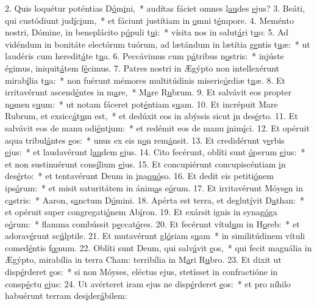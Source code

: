 2. Quis loquétur poténtias D\uline{ó}m\uline{i}ni,~* audítas fáciet omnes l\uline{au}des \uline{e}jus?
3. Beáti, qui custódiunt jud\uline{í}c\uline{i}um,~* et fáciunt justítiam in \uline{o}mni t\uline{é}mpore.
4. Meménto nostri, Dómine, in beneplácito p\uline{ó}puli t\uline{u}i:~* vísita nos in salut\uline{á}ri t\uline{u}o:
5. Ad vidéndum in bonitáte electórum tuórum, ad lætándum in lætítia g\uline{e}ntis t\uline{u}æ:~* ut laudéris cum heredit\uline{á}te t\uline{u}a.
6. Peccávimus cum p\uline{á}tribus n\uline{o}stris:~* injúste égimus, iniquit\uline{á}tem f\uline{é}cimus.
7. Patres nostri in Ægýpto non intellexérunt mirab\uline{í}lia t\uline{u}a:~* non fuérunt mémores multitúdinis miseric\uline{ó}rdiæ t\uline{u}æ.
8. Et irritavérunt ascend\uline{é}ntes in m\uline{a}re,~* M\uline{a}re R\uline{u}brum.
9. Et salvávit eos propter n\uline{o}men s\uline{u}um:~* ut notam fáceret pot\uline{é}ntiam s\uline{u}am.
10. Et incrépuit Mare Rubrum, et exsicc\uline{á}t\uline{u}m est,~* et dedúxit eos in abýssis sicut \uline{i}n des\uline{é}rto.
11. Et salvávit eos de manu odi\uline{é}nt\uline{i}um:~* et redémit eos de manu \uline{i}nim\uline{í}ci.
12. Et opéruit aqua tribul\uline{á}ntes \uline{e}os:~* unus ex eis n\uline{o}n rem\uline{á}nsit.
13. Et credidérunt v\uline{e}rbis \uline{e}jus:~* et laudavérunt l\uline{au}dem \uline{e}jus.
14. Cito fecérunt, oblíti sunt \uline{ó}perum \uline{e}jus:~* et non sustinuérunt cons\uline{í}lium \uline{e}jus.
15. Et concupiérunt concupiscéntiam \uline{i}n des\uline{é}rto:~* et tentavérunt Deum in \uline{i}na\uline{quó}so.
16. Et dedit eis petiti\uline{ó}nem ips\uline{ó}rum:~* et misit saturitátem in ánim\uline{a}s e\uline{ó}rum.
17. Et irritavérunt Móys\uline{e}n in c\uline{a}stris:~* Aaron, s\uline{a}nctum D\uline{ó}mini.
18. Apérta est terra, et deglut\uline{í}vit D\uline{a}than:~* et opéruit super congregati\uline{ó}nem Ab\uline{í}ron.
19. Et exársit ignis in synag\uline{ó}ga e\uline{ó}rum:~* flamma combússit p\uline{e}ccat\uline{ó}res.
20. Et fecérunt vítul\uline{u}m in H\uline{o}reb:~* et adorav\uline{é}runt sc\uline{ú}lptile.
21. Et mutavérunt gl\uline{ó}riam s\uline{u}am~* in similitúdinem vítuli comed\uline{é}ntis f\uline{œ}num.
22. Oblíti sunt Deum, qui salv\uline{á}vit \uline{e}os,~* qui fecit magnália in Ægýpto, mirabília in terra Cham: terribília in M\uline{a}ri R\uline{u}bro.
23. Et dixit ut disp\uline{é}rderet \uline{e}os:~* si non Móyses, eléctus ejus, stetísset in confractióne in consp\uline{é}ctu \uline{e}jus:
24. Ut avérteret iram ejus ne disp\uline{é}rderet \uline{e}os:~* et pro níhilo habuérunt terram des\uline{i}der\uline{á}bilem:
